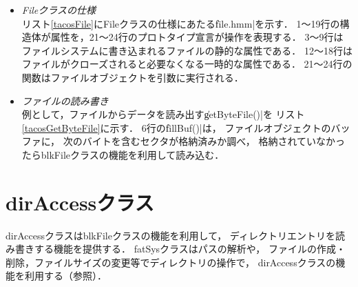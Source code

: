 \begin{itemize}
\item \emph{Fileクラスの仕様}\\
  リスト\ref{tacosFile}にFileクラスの仕様にあたる\|file.hmm|を示す．
  1〜19行の構造体が属性を，21〜24行のプロトタイプ宣言が操作を表現する．
  3〜9行はファイルシステムに書き込まれるファイルの静的な属性である．
  12〜18行はファイルがクローズされると必要なくなる一時的な属性である．
  21〜24行の関数はファイルオブジェクトを引数に実行される．

  

\item \emph{ファイルの読み書き}\\
  例として，ファイルからデータを読み出す\|getByteFile()|を
  リスト\ref{tacosGetByteFile}に示す．
  6行の\|fillBuf()|は，
  ファイルオブジェクトのバッファに，
  次のバイトを含むセクタが格納済みか調べ，
  格納されていなかったらblkFileクラスの機能を利用して読み込む．
  
  

\end{itemize}

\section{dirAccessクラス}
dirAccessクラスはblkFileクラスの機能を利用して，
ディレクトリエントリを読み書きする機能を提供する．
fatSysクラスはパスの解析や，
ファイルの作成・削除，ファイルサイズの変更等でディレクトリの操作で，
dirAccessクラスの機能を利用する（参照）．

